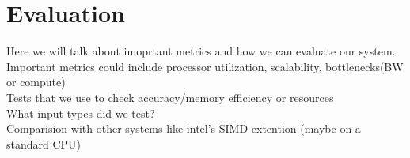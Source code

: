 \chapter{Evaluation}

Here we will talk about imoprtant metrics and how we can evaluate our system. \\
Important metrics could include processor utilization, scalability, bottlenecks(BW or compute) \\
Tests that we use to check accuracy/memory efficiency or resources \\
What input types did we test? \\ 
Comparision with other systems like intel's SIMD extention (maybe on a standard CPU) \\ 
